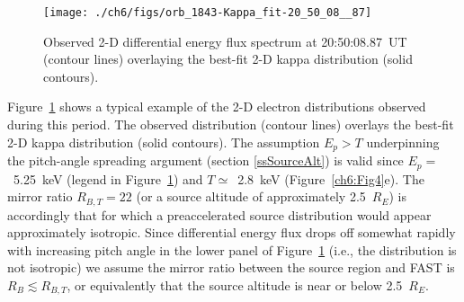
  \begin{figure}
    \centering
    \noindent\texttt{[image: ./ch6/figs/orb\_1843-Kappa\_fit-20\_50\_08\_\_87]}
    \caption[Example two-dimensional fit of inverted V precipitation (Orbit
    1843)]{Observed 2-D differential energy flux spectrum at 20:50:08.87~UT
      (contour lines) overlaying the best-fit 2-D kappa distribution (solid
      contours).}
    \label{ch6:Fig5}
  \end{figure}


  Figure~\ref{ch6:Fig5} shows a typical example of the 2-D electron
  distributions observed during this period. The observed distribution (contour
  lines) overlays the best-fit 2-D kappa distribution (solid contours). The
  assumption $E_p > T$ underpinning the pitch-angle spreading argument (section
  \ref{ssSourceAlt}) is valid since $E_p =$~5.25~keV (legend in
  Figure~\ref{ch6:Fig5}) and $T \simeq$~2.8~keV (Figure~\ref{ch6:Fig4}e). The
  mirror ratio $R_{B,T} = 22$ (or a source altitude of approximately 2.5~$R_E$)
  is accordingly that for which a preaccelerated source distribution would
  appear approximately isotropic. Since differential energy flux drops off
  somewhat rapidly with increasing pitch angle in the lower panel of
  Figure~\ref{ch6:Fig5} (i.e., the distribution is not isotropic) we assume the
  mirror ratio between the source region and FAST is $R_B \lesssim R_{B,T}$, or
  equivalently that the source altitude is near or below 2.5~$R_E$.


